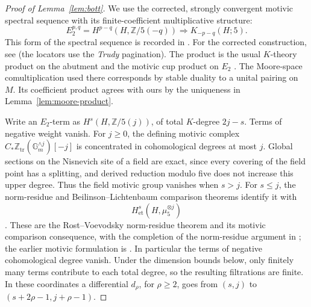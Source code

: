 \begin{proof}[Proof of Lemma~\ref{lem:bott}]
We use the corrected, strongly convergent motivic spectral sequence
with its finite-coefficient multiplicative structure:
\begin{equation}
\label{eq:motivic-ss}
 E_2^{p,q}=H^{p-q}(H,\mathbb Z/5(-q))
 \Longrightarrow K_{-p-q}(H;5).
\end{equation}
This form of the spectral sequence is recorded in
\cite[VI.4.2, Addendum~VI.4.2.1, and VI.4.4]{Weibel2013}.
For the corrected construction, see
\cite[Introduction and Theorem~6.1]{Suslin2003}
(the locators use the \emph{Trudy} pagination).
The product is the usual $K$-theory product on the abutment and the
motivic cup product on $E_2$
\cite[Proposition~16.1 and Theorem~16.2]{FriedlanderSuslin2002}.
The Moore-space comultiplication used there corresponds by stable
duality to a unital pairing on $M$.  Its coefficient product agrees with
ours by the uniqueness in Lemma~\ref{lem:moore-product}.

Write an $E_2$-term as $H^s(H,\mathbb Z/5(j))$, of total $K$-degree
$2j-s$.  Terms of negative weight vanish. For $j\geq0$, the defining
motivic complex
$C_*\mathbb Z_{\mathrm{tr}}(\mathbb G_m^{\wedge j})[-j]$
is concentrated in cohomological degrees at most $j$. Global sections
on the Nisnevich site of a field are exact, since every covering of
the field point has a splitting, and derived reduction modulo five does not
increase this upper degree. Thus the field motivic group vanishes
when $s>j$. For $s\leq j$, the norm-residue and
Beilinson--Lichtenbaum comparison theorems identify it with
\begin{equation}
\label{eq:motivic-etale}
 H^s_{\mathrm{et}}(H,\mu_5^{\otimes j})
\end{equation}
\cite[Theorems~6.16--6.17]{Voevodsky2011}.
These are the Rost--Voevodsky norm-residue theorem and its motivic
comparison consequence, with the completion of the norm-residue
argument in \cite{Weibel2009}; the earlier motivic formulation is
\cite{SuslinVoevodsky2000}.
In particular the terms of negative cohomological degree vanish.
Under the dimension bounds below, only finitely many terms contribute
to each total degree, so the resulting filtrations are finite.
In these coordinates a differential $d_\rho$, for $\rho\geq2$, goes
from $(s,j)$ to $(s+2\rho-1,j+\rho-1)$.


\end{proof}
